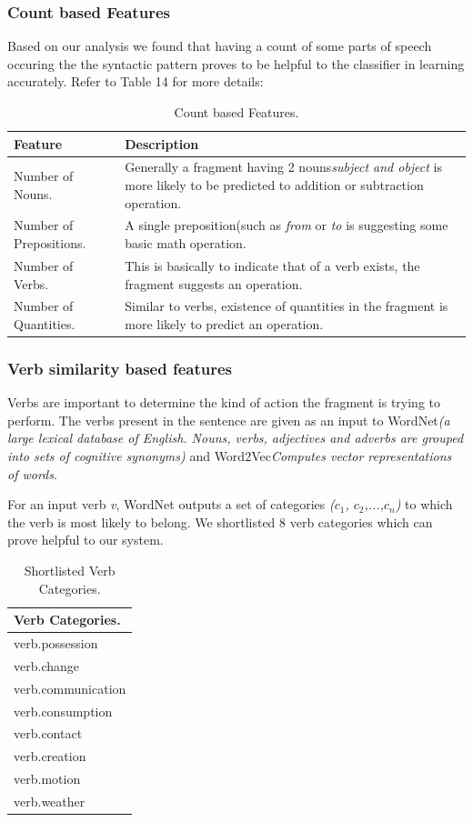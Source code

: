 \documentclass[11pt]{article}
\begin{document}
\subsubsection{Count based Features}
Based on our analysis we found that having a count of some parts of speech occuring the the syntactic pattern proves to be helpful to the classifier in learning accurately. Refer to Table 14 for more details:

\begin{table}[h!]
\centering
\begin{tabular}{ | m{5em} | m{25em} |}
\hline
\textbf{Feature} & \textbf{Description} \\
\hline
 Number of Nouns. & Generally a fragment having 2 nouns\textit{subject and object} is more likely to be predicted to addition or subtraction operation.\\
\hline
Number of Prepositions. & A single preposition(such as \textit{from} or \textit{to} is suggesting some basic math operation.\\
\hline
Number of Verbs. & This is basically to indicate that of a verb exists, the fragment suggests an operation.\\
\hline
Number of Quantities. & Similar to verbs, existence of quantities in the fragment is more likely to predict an operation.\\
\hline
\end{tabular}
\caption{Count based Features.}
\label{table:15}
\end{table}

\subsubsection{Verb similarity based features}
Verbs are important to determine the kind of action the fragment is trying to perform. The verbs present in the sentence are given as an input to WordNet\textit{(a large lexical database of English. Nouns, verbs, adjectives and adverbs are grouped into sets of cognitive synonyms)} and Word2Vec\textit{Computes vector representations of words}. 

For an input verb \textit{v}, WordNet outputs a set of categories \textit{($c_{1}$, $c_{2}$,...,$c_{n}$)} to which the verb is most likely to belong. We shortlisted 8 verb categories which can prove helpful to our system. 

\begin{table}[h!]
\centering
\begin{tabular}{ | m{15em} | }
\hline
 \textbf{Verb Categories.}\\
\hline
verb.possession\\
\hline
verb.change\\
\hline
verb.communication\\
\hline
verb.consumption\\
\hline
verb.contact\\
\hline
verb.creation\\
\hline
verb.motion\\
\hline
verb.weather\\
\hline
\end{tabular}
\caption{Shortlisted Verb Categories.}
\label{table:18}
\end{table}
\end{document}
